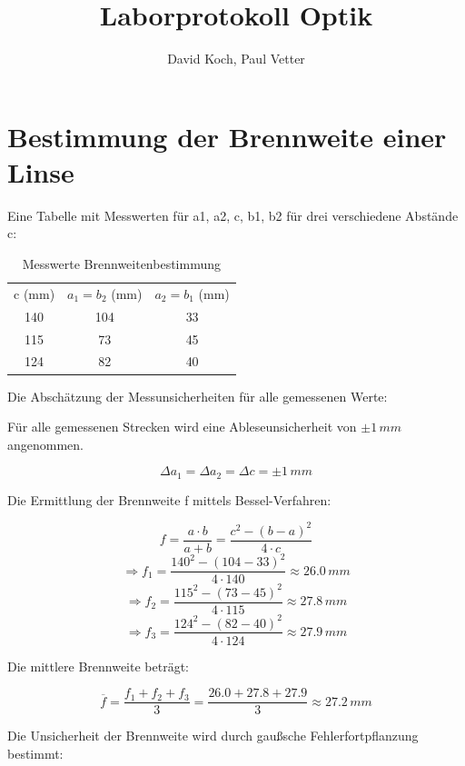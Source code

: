 \documentclass[
  headings=optiontotocandhead,
  twoside,
  openright,
  numbers=noenddot,
  toc=flat,
  11pt,
  parskip=full,
  listof=flat,
  bibliography=totoc,
  a4paper,
  DIV=14,
  BCOR=22mm,
  headheight=5mm,
  headinclude=true,
]{scrartcl}
\title{Laborprotokoll Optik}
\author{David Koch, Paul Vetter}
\date{}
\begin{document}
\begin{titlepage}
\maketitle
\tableofcontents
\end{titlepage}

\setcounter{page}{2}
\renewcommand{\thepage}{\the\numexpr\value{page}-1\relax}

\section{Bestimmung der Brennweite einer Linse}

Eine Tabelle mit Messwerten für a1, a2, c, b1, b2 für drei verschiedene Abstände c:

\begin{table}[H]
  \centering
  \setlength{\tabcolsep}{10pt}
  \begin{tabular}{ |c|c|c| }
    \multicolumn{1}{c}{c (mm)} & \multicolumn{1}{c}{$a_1 = b_2$ (mm)} & \multicolumn{1}{c}{$a_2 = b_1$ (mm)} \\
    140 & 104 & 33 \\
    115 & 73 & 45 \\
    124 & 82 & 40 \\
  \end{tabular}
  \caption{Messwerte Brennweitenbestimmung}
  \label{tab:linsen}
\end{table}

Die Abschätzung der Messunsicherheiten für alle gemessenen Werte:

Für alle gemessenen Strecken wird eine Ableseunsicherheit von $\pm 1\,mm$ angenommen.

\[
\Delta a_1 = \Delta a_2 = \Delta c = \pm 1\,mm
\]

Die Ermittlung der Brennweite f mittels Bessel-Verfahren:

$$ f = \frac{a \cdot b}{a+b} = \frac{c^2 - (b-a)^2}{4 \cdot c} $$
$$ \Rightarrow f_1 = \frac{140^2-(104-33)^2}{4 \cdot 140} \approx 26.0\,mm $$
$$ \Rightarrow f_2 = \frac{115^2-(73-45)^2}{4 \cdot 115} \approx 27.8\,mm $$
$$ \Rightarrow f_3 = \frac{124^2-(82-40)^2}{4 \cdot 124} \approx 27.9\,mm $$

Die mittlere Brennweite beträgt:

$$ \overline{f} = \frac{f_1+f_2+f_3}{3} = \frac{26.0+27.8+27.9}{3} \approx 27.2\,mm $$

Die Unsicherheit der Brennweite wird durch gaußsche Fehlerfortpflanzung bestimmt:
\end{document}
